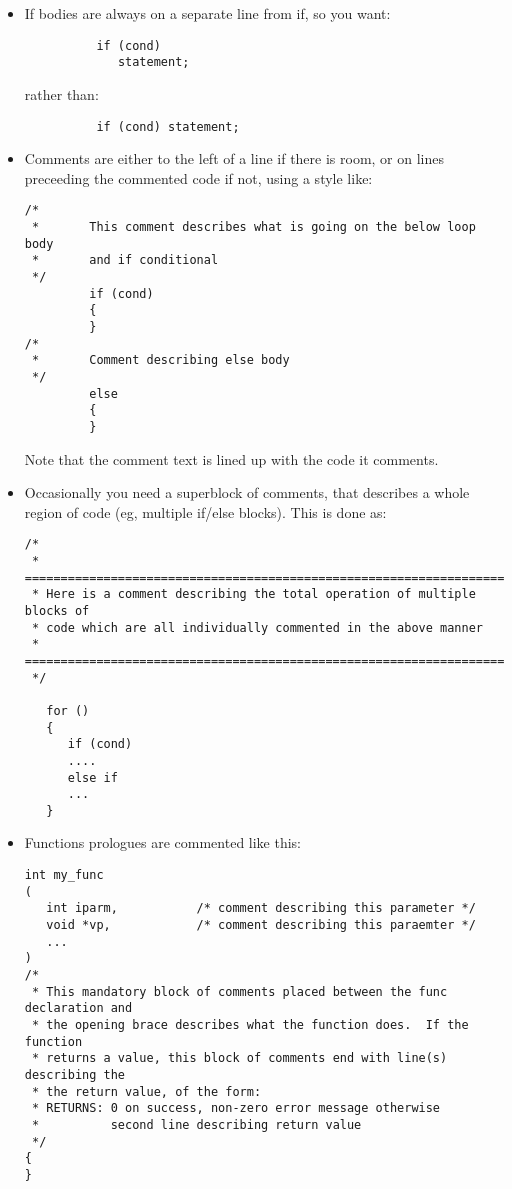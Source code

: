 \documentclass[11pt]{article}
\begin{document}
\begin{itemize}
\item If bodies are always on a separate line from if, so you want:
      \vspace*{-0.1in}
      \begin{verbatim}
          if (cond)
             statement;
      \end{verbatim}
      \vspace*{-0.3in}
      rather than:
      \vspace*{-0.1in}
      \begin{verbatim}
          if (cond) statement;
      \end{verbatim}
\item Comments are either to the left of a line if there is room, or on
      lines preceeding the commented code if not, using a style like:
      \vspace*{-0.1in}
      \begin{verbatim}
/*
 *       This comment describes what is going on the below loop body
 *       and if conditional
 */
         if (cond)
         {
         }
/*
 *       Comment describing else body
 */
         else
         {
         }
      \end{verbatim}
      \vspace*{-0.2in}
       Note that the comment text is lined up with the code it comments.
\item Occasionally you need a superblock of comments, that describes a whole
      region of code (eg, multiple if/else blocks).  This is done as:
      \vspace*{-0.1in}
\begin{verbatim}
/*
 * ======================================================================
 * Here is a comment describing the total operation of multiple blocks of
 * code which are all individually commented in the above manner
 * ======================================================================
 */

   for ()
   {
      if (cond)
      ....
      else if
      ...
   }
\end{verbatim}
\item Functions prologues are commented like this:
\begin{verbatim}
int my_func
(
   int iparm,           /* comment describing this parameter */
   void *vp,            /* comment describing this paraemter */
   ...
)
/*
 * This mandatory block of comments placed between the func declaration and
 * the opening brace describes what the function does.  If the function
 * returns a value, this block of comments end with line(s) describing the
 * the return value, of the form:
 * RETURNS: 0 on success, non-zero error message otherwise
 *          second line describing return value
 */
{
}
\end{verbatim}

\end{itemize}
\end{document}
